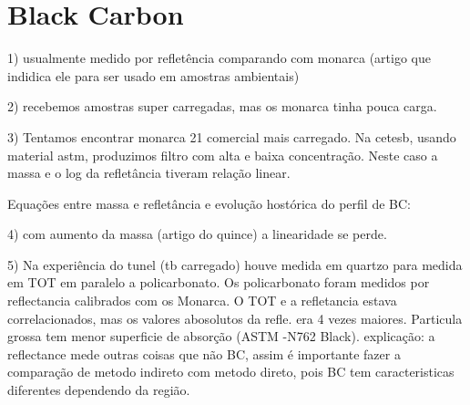 \section{Black Carbon}





1) usualmente medido por refletência comparando com monarca (artigo que indidica
ele para ser usado em amostras ambientais)

2) recebemos amostras super carregadas, mas os monarca tinha pouca carga.

3) Tentamos encontrar monarca 21 comercial mais carregado. Na cetesb,
usando material astm, produzimos filtro com alta e baixa concentração.
Neste caso a massa e o log da refletância tiveram relação linear. 

Equações entre massa e refletância e evolução hostórica do perfil de BC:

4) com aumento da massa (artigo do quince) a linearidade se perde. 

5) Na experiência do tunel (tb carregado) houve medida em quartzo para medida
em TOT em paralelo a policarbonato. Os policarbonato foram medidos por reflectancia
calibrados com os Monarca. O TOT e a refletancia estava correlacionados, mas
os valores abosolutos da refle. era 4 vezes maiores.
Particula grossa tem menor superficie de absorção (ASTM -N762 Black). 
explicação: a reflectance mede outras coisas que não BC, assim é importante
fazer a comparação de metodo indireto com metodo direto, pois BC tem caracteristicas
diferentes dependendo da região.

